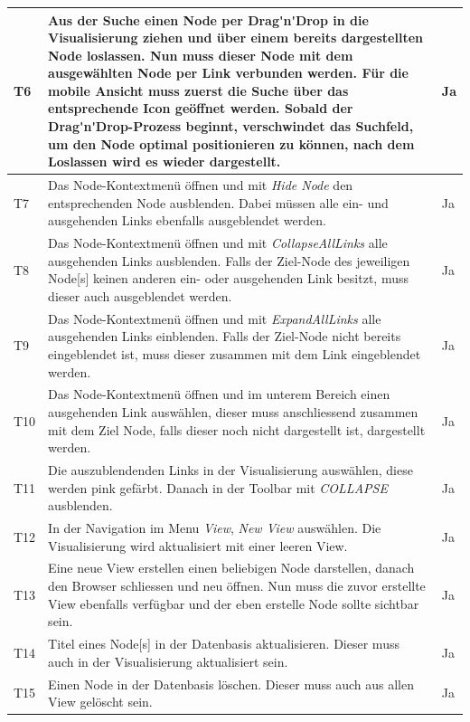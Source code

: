 \begin{longtable}{|p{1cm} | p{10cm} |p{1.2cm} |}
    T6 & Aus der Suche einen \gls{Node} per \gls{Drag'n'Drop} in die Visualisierung ziehen und über einem bereits dargestellten \gls{Node} loslassen. Nun muss dieser \gls{Node} mit dem ausgewählten \gls{Node} per Link verbunden werden. Für die mobile Ansicht muss zuerst die Suche über das entsprechende Icon geöffnet werden. Sobald der \gls{Drag'n'Drop}-Prozess beginnt, verschwindet das Suchfeld, um den \gls{Node} optimal positionieren zu können, nach dem Loslassen wird es wieder dargestellt. & Ja \\\hline
    T7 & Das \gls{Node}-Kontextmenü öffnen und mit \textit{Hide Node} den entsprechenden \gls{Node} ausblenden. Dabei müssen alle ein- und ausgehenden Links ebenfalls ausgeblendet werden. & Ja\\\hline
    T8 & Das \gls{Node}-Kontextmenü öffnen und mit \textit{CollapseAllLinks} alle ausgehenden Links ausblenden. Falls der Ziel-\gls{Node} des jeweiligen \gls{Node}[s] keinen anderen ein- oder ausgehenden Link besitzt, muss dieser auch ausgeblendet werden. & Ja\\\hline
    T9 & Das \gls{Node}-Kontextmenü öffnen und mit \textit{ExpandAllLinks} alle ausgehenden Links einblenden. Falls der Ziel-\gls{Node} nicht bereits eingeblendet ist, muss dieser zusammen mit dem Link eingeblendet werden. & Ja\\\hline
    T10 & Das \gls{Node}-Kontextmenü öffnen und im unterem Bereich einen ausgehenden Link auswählen, dieser muss anschliessend zusammen mit dem Ziel \gls{Node}, falls dieser noch nicht dargestellt ist, dargestellt werden. & Ja\\\hline
    T11 & Die auszublendenden Links in der Visualisierung auswählen, diese werden pink gefärbt. Danach in der Toolbar mit \textit{COLLAPSE} ausblenden. & Ja \\\hline
    T12 & In der Navigation im Menu \textit{View}, \textit{New View} auswählen. Die Visualisierung wird aktualisiert mit einer leeren \gls{View}. & Ja\\\hline
    T13 & Eine neue \gls{View} erstellen einen beliebigen \gls{Node} darstellen, danach den Browser schliessen und neu öffnen. Nun muss die zuvor erstellte \gls{View} ebenfalls verfügbar und der eben erstelle \gls{Node} sollte sichtbar sein. & Ja\\\hline
    T14 & Titel eines \gls{Node}[s] in der Datenbasis aktualisieren. Dieser muss auch in der Visualisierung aktualisiert sein. & Ja\\\hline
    T15 & Einen \gls{Node} in der Datenbasis löschen. Dieser muss auch aus allen \gls{View} gelöscht sein. & Ja\\\hline

\end{longtable}
